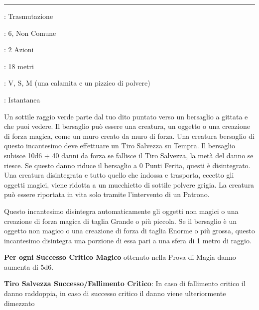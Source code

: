 \begin{multicols}{2}
\smallskip\noindent\rule{\linewidth}{2pt} \hypertarget{Disintegrazione}{}\medskip{}
\noindent
\begin{description}[noitemsep, topsep=0pt, parsep=0pt, partopsep=0pt, leftmargin=0cm, labelwidth=2.8cm]
	\item[\textbf{Lista di Magia}]: Trasmutazione
	\item[\textbf{Livello}]: 6, Non Comune
	\item[\textbf{T. di Lancio}]: 2 Azioni
	\item[\textbf{Gittata}]: 18 metri
	\item[\textbf{Componenti}]: V, S, M (una calamita e un pizzico di polvere)
	\item[\textbf{Durata}]: Istantanea
\end{description}

Un sottile raggio verde parte dal tuo dito puntato verso un bersaglio a gittata e che puoi vedere. Il bersaglio può essere una creatura, un oggetto o una creazione di forza magica, come un muro creato da muro di forza. Una creatura bersaglio di questo incantesimo deve effettuare un Tiro Salvezza su Tempra. Il bersaglio subisce 10d6 + 40 danni da forza se fallisce il Tiro Salvezza, la metà del danno se riesce. Se questo danno riduce il bersaglio a 0 Punti Ferita, questi è disintegrato. Una creatura disintegrata e tutto quello che indossa e trasporta, eccetto gli oggetti magici, viene ridotta a un mucchietto di sottile polvere grigia. La creatura può essere riportata in vita solo tramite l'intervento di un Patrono.

Questo incantesimo disintegra automaticamente gli oggetti non magici o una creazione di forza magica di taglia Grande o più piccola. Se il bersaglio è un oggetto non magico o una creazione di forza di taglia Enorme o più grossa, questo incantesimo disintegra una porzione di essa pari a una sfera di 1 metro di raggio.

\textbf{Per ogni Successo Critico Magico} ottenuto nella Prova di Magia danno aumenta di 5d6.

\textbf{Tiro Salvezza Successo/Fallimento Critico}: In caso di fallimento critico il danno raddoppia, in caso di successo critico il danno viene ulteriormente dimezzato


\end{multicols}

